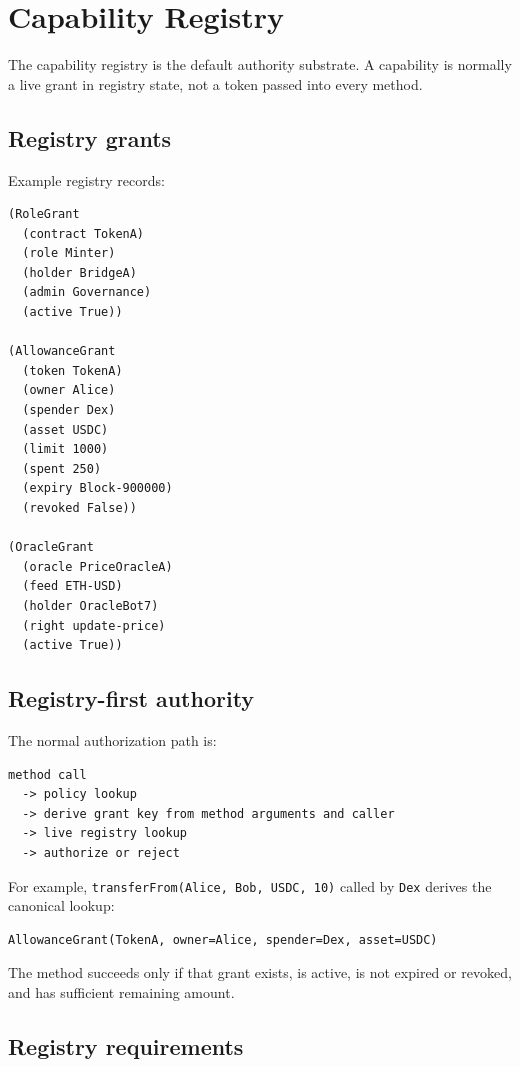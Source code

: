 \documentclass[11pt]{article}
\newcommand{\code}[1]{\texttt{#1}}
\begin{document}
\section{Capability Registry}

The capability registry is the default authority substrate. A capability is normally a live grant in registry state, not a token passed into every method.

\subsection{Registry grants}

Example registry records:

\begin{lstlisting}
(RoleGrant
  (contract TokenA)
  (role Minter)
  (holder BridgeA)
  (admin Governance)
  (active True))

(AllowanceGrant
  (token TokenA)
  (owner Alice)
  (spender Dex)
  (asset USDC)
  (limit 1000)
  (spent 250)
  (expiry Block-900000)
  (revoked False))

(OracleGrant
  (oracle PriceOracleA)
  (feed ETH-USD)
  (holder OracleBot7)
  (right update-price)
  (active True))
\end{lstlisting}

\subsection{Registry-first authority}

The normal authorization path is:

\begin{lstlisting}
method call
  -> policy lookup
  -> derive grant key from method arguments and caller
  -> live registry lookup
  -> authorize or reject
\end{lstlisting}

For example, \code{transferFrom(Alice, Bob, USDC, 10)} called by \code{Dex} derives the canonical lookup:

\begin{lstlisting}
AllowanceGrant(TokenA, owner=Alice, spender=Dex, asset=USDC)
\end{lstlisting}

The method succeeds only if that grant exists, is active, is not expired or revoked, and has sufficient remaining amount.

\subsection{Registry requirements}
\end{document}
